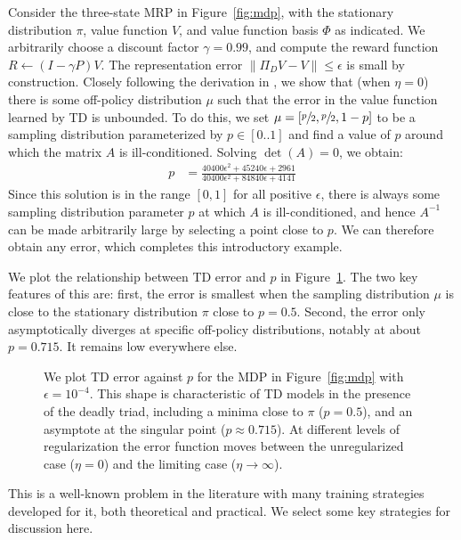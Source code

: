 \documentclass[11pt]{article}
\begin{document}
Consider the three-state MRP in Figure~\ref{fig:mdp}, with the stationary distribution $\pi$, value function $V$, and value function basis $\Phi$ as indicated. We arbitrarily choose a discount factor $\gamma = 0.99$, and compute the reward function $R \gets (I-\gamma P)V$. The representation error $\|\Pi_D V - V\| \leq \epsilon$ is small by construction.
Closely following the derivation in \cite{kolter2011fixed}, we show that (when $\eta=0$) there is some off-policy distribution $\mu$ such that the error in the value function learned by TD is unbounded. To do this, we set $\mu = [\sfrac p2, \sfrac p2, 1-p]$ to be a sampling distribution parameterized by $p \in [0..1]$ and find a value of $p$ around which the matrix $A$ is ill-conditioned. Solving $\det(A) = 0$, we obtain:
\begin{align}
  p & = \frac{40400\epsilon^2 + 45240\epsilon + 2961}{40400\epsilon^2 + 84840\epsilon + 4141}\label{eqn:simplep}
\end{align}
Since this solution is in the range $[0, 1]$ for all positive $\epsilon$, there is always some sampling distribution parameter $p$ at which $A$ is ill-conditioned, and hence $A^{-1}$ can be made arbitrarily large by selecting a point close to $p$. We can therefore obtain any error, which completes this introductory example.

We plot the relationship between TD error and $p$ in Figure~\ref{fig:fixedpointp}. The two key features of this are: first, the error is smallest when the sampling distribution $\mu$ is close to the stationary distribution $\pi$ close to $p=0.5$. Second, the error only asymptotically diverges at specific off-policy distributions, notably at about $p=0.715$. It remains low everywhere else.

\begin{figure}[!p]
    
    \caption{We plot TD error against $p$ for the MDP in Figure~\ref{fig:mdp} with $\epsilon=10^{-4}$. This shape is characteristic of TD models in the presence of the deadly triad, including a minima close to $\pi$ ($p=0.5$), and an asymptote at the singular point ($p\approx 0.715$). At different levels of regularization the error function moves between the unregularized case ($\eta=0$) and the limiting case ($\eta\to\infty$).}
    \label{fig:fixedpointp}
\end{figure}

This is a well-known problem in the literature with many training strategies developed for it, both theoretical and practical. We select some key strategies for discussion here.
\end{document}
